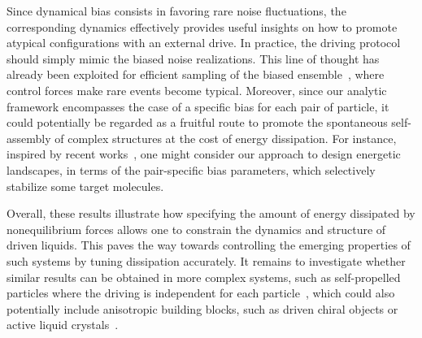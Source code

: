 \documentclass[superscriptaddress, twocolumn, prx, longbibliography, nofootinbib]{revtex4-1}
\begin{document}
Since dynamical bias consists in favoring rare noise fluctuations, the corresponding dynamics effectively provides useful insights on how to promote atypical configurations with an external drive. In practice, the driving protocol should simply mimic the biased noise realizations. This line of thought has already been exploited for efficient sampling of the biased ensemble~\cite{Nemoto2016, Jack2017, Jack2018}, where control forces make rare events become typical. Moreover, since our analytic framework encompasses the case of a specific bias for each pair of particle, it could potentially be regarded as a fruitful route to promote the spontaneous self-assembly of complex structures at the cost of energy dissipation. For instance, inspired by recent works~\cite{Murugan2015, Murugan2017b}, one might consider our approach to design energetic landscapes, in terms of the pair-specific bias parameters, which selectively stabilize some target molecules. 

Overall, these results illustrate how specifying the amount of energy dissipated by nonequilibrium forces allows one to constrain the dynamics and structure of driven liquids. This paves the way towards controlling the emerging properties of such systems by tuning dissipation accurately. It remains to investigate whether similar results can be obtained in more complex systems, such as self-propelled particles where the driving is independent for each particle~\cite{Marchetti2013, Cates2015, Bechinger2016, Marchetti2018}, which could also potentially include anisotropic building blocks, such as driven chiral objects or active liquid crystals~\cite{Joshi2017, VanZuiden2016, Nguyen2014b}. 




\end{document}
